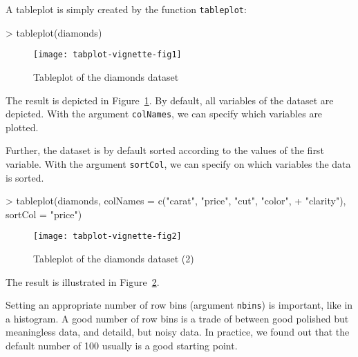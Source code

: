 \documentclass[11pt, fleqn, a4paper]{article}
\begin{document}
\begin{Schunk}
\end{Schunk}

A tableplot is simply created by the function {\tt tableplot}:
\begin{Schunk}
\begin{Sinput}
> tableplot(diamonds)
\end{Sinput}
\end{Schunk}

\begin{figure}
\begin{center}
\texttt{[image: tabplot-vignette-fig1]}
\end{center}
\caption{Tableplot of the diamonds dataset}
\label{fig:tp1}
\end{figure}

The result is depicted in Figure~\ref{fig:tp1}. By default, all variables of the dataset are depicted. With the argument {\tt colNames}, we can specify which variables are plotted. 

Further, the dataset is by default sorted according to the values of the first variable. With the argument {\tt sortCol}, we can specify on which variables the data is sorted.

\begin{Schunk}
\begin{Sinput}
> tableplot(diamonds, colNames = c("carat", "price", "cut", "color", 
+     "clarity"), sortCol = "price")
\end{Sinput}
\end{Schunk}

\begin{figure}
\begin{center}
\texttt{[image: tabplot-vignette-fig2]}
\end{center}
\caption{Tableplot of the diamonds dataset (2)}
\label{fig:tp2}
\end{figure}

The result is illustrated in Figure~\ref{fig:tp2}. 

Setting an appropriate number of row bins (argument {\tt nbins}) is important, like in a histogram. A good number of row bins is a trade of between good polished but meaningless data, and detaild, but noisy data. In practice, we found out that the default number of 100 usually is a good starting point.
\end{document}
